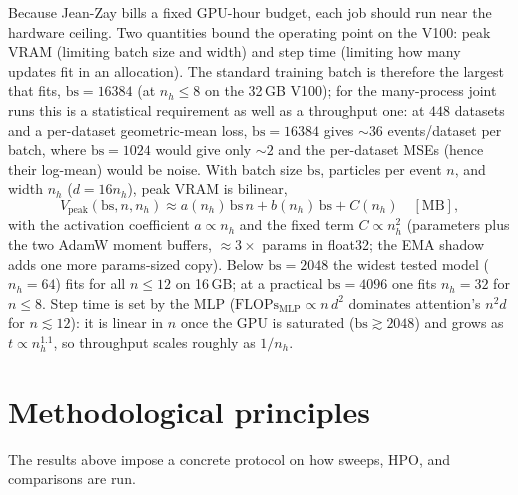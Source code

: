 \documentclass[11pt]{article}
\newcommand{\nh}{n_h}
\begin{document}
Because Jean-Zay bills a fixed GPU-hour budget, each job should run near the hardware ceiling.
Two quantities bound the operating point on the V100: peak VRAM (limiting batch size and width)
and step time (limiting how many updates fit in an allocation). The standard training batch is
therefore the largest that fits, $\mathrm{bs}=16384$ (at $\nh\!\le\!8$ on the 32\,GB V100);
for the many-process joint runs this is a statistical requirement as well as a throughput one:
at $448$ datasets and a per-dataset geometric-mean loss, $\mathrm{bs}=16384$ gives
$\sim\!36$ events/dataset per batch, where $\mathrm{bs}=1024$ would give only $\sim\!2$ and the
per-dataset MSEs (hence their log-mean) would be noise. With batch size $\mathrm{bs}$,
particles per event $n$, and width $\nh$ ($d=16\nh$), peak VRAM is bilinear,
\begin{equation}
  V_{\text{peak}}(\mathrm{bs},n,\nh) \approx a(\nh)\,\mathrm{bs}\,n + b(\nh)\,\mathrm{bs} + C(\nh)
  \quad[\mathrm{MB}],
  \label{eq:vram}
\end{equation}
with the activation coefficient $a\propto\nh$ and the fixed term $C\propto\nh^2$ (parameters
plus the two AdamW moment buffers, $\approx3\times$ params in float32; the EMA shadow adds one
more params-sized copy). Below $\mathrm{bs}=2048$ the widest tested model ($\nh=64$) fits for
all $n\le12$ on 16\,GB; at a practical $\mathrm{bs}=4096$ one fits $\nh=32$ for $n\le8$. Step
time is set by the MLP ($\mathrm{FLOPs}_{\text{MLP}}\propto n\,d^2$ dominates attention's
$n^2 d$ for $n\lesssim12$): it is linear in $n$ once the GPU is saturated
($\mathrm{bs}\gtrsim2048$) and grows as $t\propto\nh^{1.1}$, so throughput scales roughly as
$1/\nh$.

\section{Methodological principles}\label{sec:principles}

The results above impose a concrete protocol on how sweeps, HPO, and comparisons are run.
\end{document}
